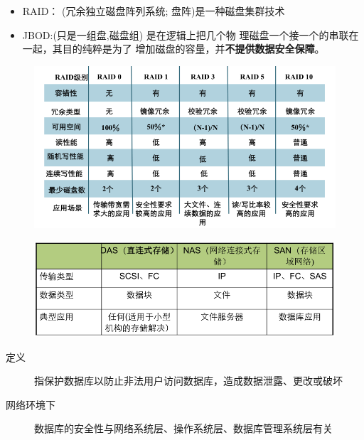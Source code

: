 \begin{itemize}
	\item RAID： (冗余独立磁盘阵列系统; 盘阵)是一种磁盘集群技术
	\item JBOD:(只是一组盘,磁盘组) 是在逻辑上把几个物
	理磁盘一个接一个的串联在一起，其目的纯粹是为了
	增加磁盘的容量，并\textbf{不提供数据安全保障}。
\end{itemize}

\begin{figure}[H]
	\centering
	\includegraphics[width=0.8\linewidth]{figures/screenshot008}
	\caption{}
	\label{fig:screenshot008}
\end{figure}

\begin{figure}[H]
	\centering
	\includegraphics[width=0.8\linewidth]{figures/screenshot009}
	\caption{}
	\label{fig:screenshot009}
\end{figure}


\begin{description}
	\item[定义] 指保护数据库以防止非法用户访问数据库，造成数据泄露、更改或破坏
	\item[网络环境下] 数据库的安全性与网络系统层、操作系统层、数据库管理系统层有关
\end{description}







